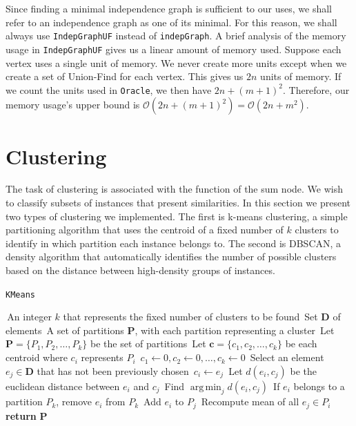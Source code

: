 \documentclass{amsart}
\DeclareMathOperator*{\argmin}{arg\,min}
\theoremstyle{plain}
\numberwithin{equation}{section}
\newcommand{\set}[1]{\mathbf{#1}}
\newcommand{\bigo}{\mathcal{O}}
\newcommand{\code}[1]{\lstinline[mathescape=true]{#1}}
\begin{document}
Since finding a minimal independence graph is sufficient to our uses, we shall refer to an
independence graph as one of its minimal. For this reason, we shall always use \code{IndepGraphUF}
instead of \code{indepGraph}. A brief analysis of the memory usage in \code{IndepGraphUF} gives us
a linear amount of memory used. Suppose each vertex uses a single unit of memory. We never create
more units except when we create a set of Union-Find for each vertex. This gives us $2n$ units of
memory. If we count the units used in \code{Oracle}, we then have $2n + {(m+1)}^2$. Therefore, our
memory usage's upper bound is $\bigo(2n + {(m+1)}^2)=\bigo(2n+m^2)$.

\section{Clustering}

The task of clustering is associated with the function of the sum node. We wish to classify
subsets of instances that present similarities. In this section we present two types of clustering
we implemented. The first is k-means clustering, a simple partitioning algorithm that uses the
centroid of a fixed number of $k$ clusters to identify in which partition each instance belongs to.
The second is DBSCAN, a density algorithm that automatically identifies the number of possible
clusters based on the distance between high-density groups of instances.

\begin{algorithm}[H]
  \caption{\code{KMeans}}\label{alg:kmeans}
  \begin{algorithmic}[1]
    \Require\,An integer $k$ that represents the fixed number of clusters to be found
    \Require\,Set $\set{D}$ of elements
    \Ensure\,A set of partitions $\set{P}$, with each partition representing a cluster
    \State\,Let $\set{P}=\{P_1,P_2,\ldots,P_k\}$ be the set of partitions
    \State\,Let $\set{c}=\{c_1,c_2,\ldots,c_k\}$ be each centroid where $c_i$ represents $P_i$
    \State\,$c_1\gets 0,c_2\gets 0,\ldots,c_k\gets 0$
      \State\,Select an element $e_j\in\set{D}$ that has not been previously chosen
      \State\,$c_i\gets e_j$
    \EndFor%
    \Repeat%
      \For{each $e_i\in\set{D}$}
        \State\,Let $d(e_i,c_j)$ be the euclidean distance between $e_i$ and $c_j$
        \State\,Find $\argmin_j d(e_i,c_j)$
        \State\,If $e_i$ belongs to a partition $P_k$, remove $e_i$ from $P_k$
        \State\,Add $e_i$ to $P_j$
      \EndFor%
      \For{each $c_i\in\set{c}$}
        \State\,Recompute mean of all $e_j\in P_i$
      \EndFor%
    \State\,\textbf{return} $\set{P}$
  \end{algorithmic}
\end{algorithm}
\end{document}
